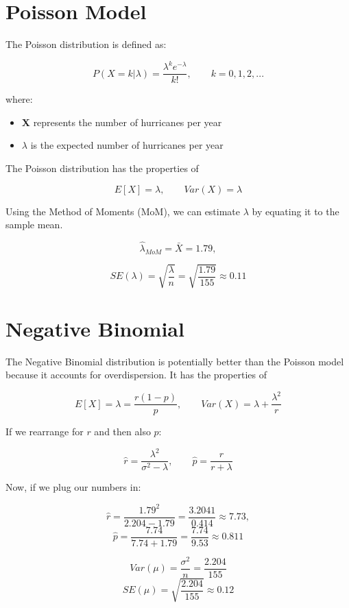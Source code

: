 \documentclass[11pt,spanish]{report}
\begin{document}
    \section{Poisson Model}

    The Poisson distribution is defined as:

    \begin{center}
        \[ P(X=k|\lambda)=\frac{\lambda^{k}e^{-\lambda}}{k!}, \qquad k=0,1,2,... \]
    \end{center}

    where:

    \begin{itemize}
        \item \textbf{X} represents the number of hurricanes per year
        \item \boldmath$\lambda$ is the expected number of hurricanes per year
    \end{itemize}

    The Poisson distribution has the properties of

    \[E[X]=\lambda,\qquad Var(X)=\lambda\]

    Using the Method of Moments (MoM), we can estimate $\lambda$ by equating it to the sample mean.

    \[\hat{\lambda}_{MoM}=\bar{X}=1.79,\]

    \[SE(\lambda)=\sqrt{\frac{\lambda}{n}}=\sqrt{\frac{1.79}{155}}\approx0.11\]

    \section{Negative Binomial}

    The Negative Binomial distribution is potentially better than the Poisson model because it accounts for overdispersion. It has the properties of

    \[E[X]=\lambda=\frac{r(1-p)}{p},\qquad Var(X)=\lambda+\frac{\lambda^{2}}{r}\]

    If we rearrange for $r$ and then also $p$:

    \[\hat{r}=\frac{\lambda^{2}}{\sigma^{2}-\lambda},\qquad \hat{p}=\frac{r}{r+\lambda}\]

    Now, if we plug our numbers in:

    \[\hat{r}=\frac{1.79^{2}}{2.204-1.79}=\frac{3.2041}{0.414}\approx7.73,\]
    \[\hat{p}=\frac{7.74}{7.74+1.79}=\frac{7.74}{9.53}\approx0.811\]

    \[Var(\mu)=\frac{\sigma^{2}}{n}=\frac{2.204}{155}\]
    \[SE(\mu)=\sqrt{\frac{2.204}{155}}\approx0.12\]
\end{document}
